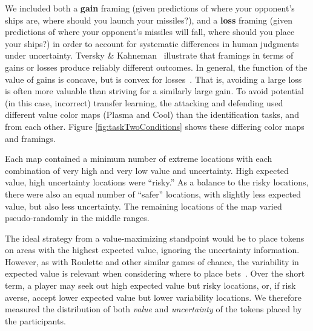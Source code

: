 \documentclass{vgtc}                          %
\begin{document}
We included both a \textbf{gain} framing (given predictions of where your opponent's ships are, where should you launch your missiles?), and a \textbf{loss} framing (given predictions of where your opponent's missiles will fall, where should you place your ships?) in order to account for systematic differences in human judgments under uncertainty. Tversky \& Kahneman~\cite{tversky1985framing} illustrate that framings in terms of gains or losses produce reliably different outcomes. In general, the function of the value of gains is concave, but is convex for losses~\cite{kahneman1979prospect}. That is, avoiding a large loss is often more valuable than striving for a similarly large gain. To avoid potential (in this case, incorrect) transfer learning, the attacking and defending used different value color maps (Plasma and Cool) than the identification tasks, and from each other.  Figure \ref{fig:taskTwoConditions} shows these differing color maps and framings.

Each map contained a minimum number of extreme locations with each combination of very high and very low value and uncertainty. High expected value, high uncertainty locations were ``risky.'' As a balance to the risky locations, there were also an equal number of ``safer'' locations, with slightly less expected value, but also less uncertainty. The remaining locations of the map varied pseudo-randomly in the middle ranges.

The ideal strategy from a value-maximizing standpoint would be to place tokens on areas with the highest expected value, ignoring the uncertainty information. However, as with Roulette and other similar games of chance, the variability in expected value is relevant when considering where to place bets~\cite{mlodinow2009drunkard}. Over the short term, a player may seek out high expected value but risky locations, or, if risk averse, accept lower expected value but lower variability locations. We therefore measured the distribution of both \emph{value} and \emph{uncertainty} of the tokens placed by the participants. 



\end{document}

